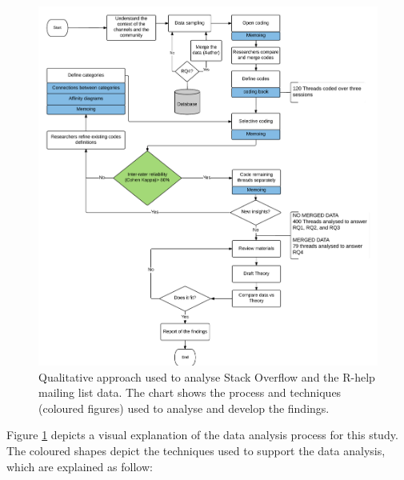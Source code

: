 \documentclass{sig-alternate-05-2015}
\begin{document}
	\begin{figure} [!htb]
		\centering
		\includegraphics[width=\columnwidth]{Figures/ContentAnalysisFlow_3}
		\caption[Our content analysis method]{Qualitative approach used to analyse Stack Overflow and the R-help mailing list data. The chart shows the process and techniques (coloured figures) used to analyse and develop the findings.}
		\label{fig:ContentAnalysisFlow}
	\end{figure}

Figure \ref{fig:ContentAnalysisFlow} depicts a visual explanation of the data analysis process for this study.
The coloured shapes depict the techniques used to support the data analysis, which are explained as follow:
\end{document}
